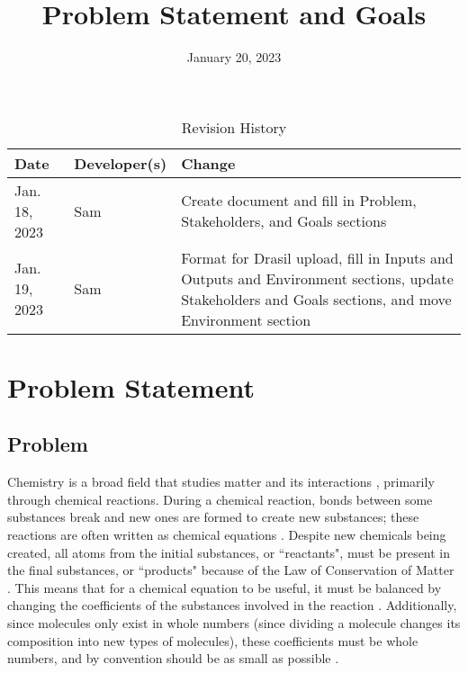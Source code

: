 \documentclass{article}
\title{Problem Statement and Goals\\\progname}
\author{\authname}
\date{January 20, 2023}
\begin{document}
\maketitle

\begin{table}[hp]
\caption{Revision History} \label{TblRevisionHistory}
\begin{tabularx}{\textwidth}{llX}
\toprule
\textbf{Date} & \textbf{Developer(s)} & \textbf{Change}\\
\midrule
Jan. 18, 2023 & Sam & Create document and fill in Problem, Stakeholders, and
Goals sections\\
Jan. 19, 2023 & Sam & Format for Drasil upload, fill in Inputs and Outputs
and Environment sections, update Stakeholders and Goals sections, and move
Environment section\\
\bottomrule
\end{tabularx}
\end{table}

\section{Problem Statement}


\subsection{Problem}

Chemistry is a broad field that studies matter and its interactions
\cite{gordon_chm101_2023}, primarily through chemical reactions.
During a chemical reaction, bonds between some substances break and new ones are
formed to create new substances; these reactions are often written as chemical
equations \cite{lund_introduction_2023}. Despite new chemicals being created,
all atoms from the initial substances, or ``reactants", must be present in the
final substances, or ``products" because of the Law of Conservation of Matter
\cite{lund_introduction_2023}. This means that for a chemical equation to be
useful, it must be balanced by changing the coefficients of the substances
involved in the reaction \cite{lund_introduction_2023}. Additionally, since
molecules only exist in whole numbers (since dividing a molecule changes its
composition into new types of molecules), these coefficients must be whole
numbers, and by convention should be as small as possible
\cite{lund_introduction_2023}.
\end{document}
